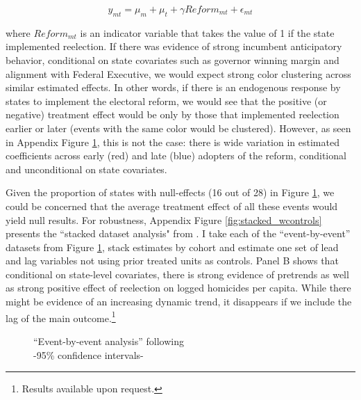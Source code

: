 \documentclass[12pt]{amsart}
\numberwithin{equation}{section}
\theoremstyle{definition}
\theoremstyle{definition}
\theoremstyle{definition}
\begin{document}
\begin{appendix}
\begin{equation}
y_{mt}=\mu_m	 + \mu_t + \gamma Reform_{mt} + \epsilon_{mt}
\end{equation}

where $Reform_{mt}$ is an indicator variable that takes the value of 1 if the state implemented reelection. If there was evidence of strong incumbent anticipatory behavior, conditional on state covariates such as governor winning margin and alignment with Federal Executive, we would expect strong color clustering across similar estimated effects. In other words, if there is an endogenous response by states to implement the electoral reform, we would see that the positive (or negative) treatment effect would be only by those that implemented reelection earlier or later (events with the same color would be clustered). However, as seen in Appendix Figure \ref{fig:CDLZ}, this is not the case: there is wide variation in estimated coefficients across early (red) and late (blue) adopters of the reform, conditional and unconditional on state covariates.    

Given the proportion of states with null-effects (16 out of 28) in  Figure \ref{fig:CDLZ}, we could be concerned that the average treatment effect of all these events would yield null results. For robustness, Appendix Figure \ref{fig:stacked_wcontrols} presents the ``stacked dataset analysis" from \citet{cengiz_etal_2019}. I take each of the ``event-by-event'' datasets from Figure \ref{fig:CDLZ}, stack estimates by cohort and estimate one set of lead and lag variables not using prior treated units as controls. Panel B shows that conditional on state-level covariates, there is strong evidence of pretrends as well as strong positive effect of reelection on logged homicides per capita. While there might be evidence of an increasing dynamic trend, it disappears if we include the lag of the main outcome.\footnote{Results available upon request.}  

     
\begin{figure}[H]
\centering
\caption{``Event-by-event analysis'' following \citet{cengiz_etal_2019}\\ -95\% confidence intervals-} 
\label{fig:CDLZ}


\end{figure}
\end{appendix}
\end{document}
